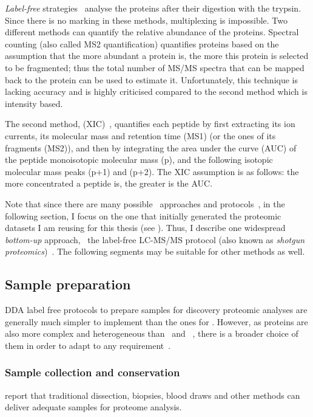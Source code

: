 \emph{Label-free} strategies~
analyse the proteins after their digestion with the trypsin.
Since there is no marking in these methods, multiplexing is impossible.
Two different methods can quantify the relative abundance of the proteins.
Spectral counting (also called MS2 quantification)
quantifies proteins based on the assumption that
the more abundant a protein is, the more this protein is selected to be fragmented;
thus the total number of \gls{MS/MS} spectra that can be mapped back to
the protein can be used to estimate it.
Unfortunately, this technique is lacking accuracy and is highly criticised
compared to the second method which is intensity based.

The second method,  (\gls{XIC})~,
quantifies each peptide by first extracting its ion currents,
its molecular mass and retention time (MS1) (or the ones of its fragments (MS2)),
and then by integrating the area under the curve (\gls{AUC}) of the peptide
monoisotopic molecular mass (p),
and the following isotopic molecular mass peaks (p+1) and (p+2).
The \gls{XIC} assumption is as follows: the more concentrated a peptide is,
the greater is the \gls{AUC}.\mybr\

Note that since there are many possible \ms\ approaches and protocols~,
in the following section, I focus on the one
that initially generated the proteomic datasets
I am reusing for this thesis (see ).
Thus, I describe one widespread \emph{bottom-up} approach,
\ie\ the label-free \gls{LC-MS/MS} protocol
(also known as \emph{shotgun proteomics})~.
The following segments may be suitable for other methods as well.\mybr\

\subsection{Sample preparation}\label{subsec:ProtSampPrep}
\gls{DDA} label free protocols to prepare samples for discovery proteomic analyses
are generally much simpler to implement than the ones for \Rnaseq.
However, as proteins are also more complex and heterogeneous
than \DNA\ and \RNA~, there is a broader choice of them
in order to adapt to any requirement~.\mybr\

\subsubsection{Sample collection and conservation}
\citet{Feist2015} report that traditional dissection, biopsies, blood draws and
other methods can deliver adequate samples for proteome analysis.\mybr\

